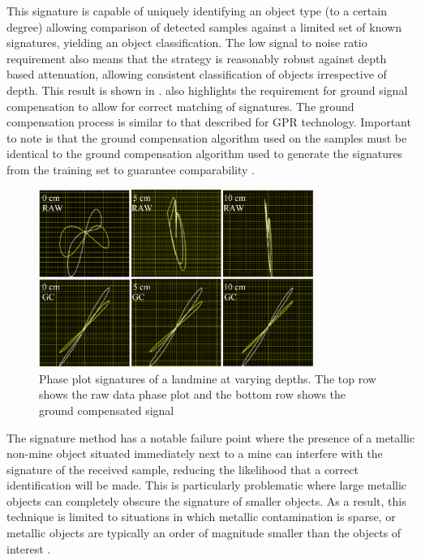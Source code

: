 \documentclass[main.tex]{subfiles}
\begin{document}
This signature is capable of uniquely identifying an object type (to a certain degree) allowing comparison of detected samples against a limited set of known signatures, yielding an object classification. The low signal to noise ratio requirement also means that the strategy is reasonably robust against depth based attenuation, allowing consistent classification of objects irrespective of depth. This result is shown in .  also highlights the requirement for ground signal compensation to allow for correct matching of signatures. The ground compensation process is similar to that described for GPR technology. Important to note is that the ground compensation algorithm used on the samples must be identical to the ground compensation algorithm used to generate the signatures from the training set to guarantee comparability \parencite{Kruger2006}.
\begin{figure}[ht]
\includegraphics[width=0.8\textwidth]{2-LiteratureReview/compensated-signature.png}
\centering
\caption[Phase plot signatures of a landmine at varying depths]{Phase plot signatures of a landmine at varying depths. The top row shows the raw data phase plot and the bottom row shows the ground compensated signal \parencite{Kruger2006}} 
\end{figure}

The signature method has a notable failure point where the presence of a metallic non-mine object situated immediately next to a mine can interfere with the signature of the received sample, reducing the likelihood that a correct identification will be made. This is particularly problematic where large metallic objects can completely obscure the signature of smaller objects. As a result, this technique is limited to situations in which metallic contamination is sparse, or metallic objects are typically an order of magnitude smaller than the objects of interest \parencite{Kruger2006}.
\end{document}
